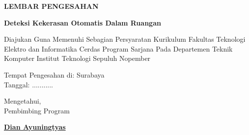 \begin{center}
  {\Large \textbf{LEMBAR PENGESAHAN}}
  \vspace{6ex}


  {\large \textbf{Deteksi Kekerasan Otomatis Dalam Ruangan}}
  \vspace{6ex}

  Diajukan Guna Memenuhi Sebagian Persyaratan Kurikulum Fakultas Teknologi Elektro dan Informatika Cerdas Program Sarjana Pada Departemen Teknik Komputer Institut Teknologi Sepuluh Nopember
  \vspace{2ex}

  Tempat Pengesahan di: Surabaya \\
  Tanggal: ...........
  \vspace{8ex}

  Mengetahui, \\
  Pembimbing Program
  \vspace{12ex}

  \textbf{\underline{Dian Ayuningtyas}}
  \vspace{8ex}

\end{center}
